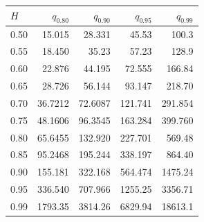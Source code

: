 \begin{tabular}{@{}lrrrr@{}}\toprule
$H$ & $q_{0.80}$ & $q_{0.90}$ & $q_{0.95}$ & $q_{0.99}$\\\midrule
0.50 & 15.015 & 28.331 & 45.53 & 100.3\\
0.55 & 18.450 & 35.23 & 57.23 & 128.9\\
0.60 & 22.876 & 44.195 & 72.555 & 166.84\\
0.65 & 28.726 & 56.144 & 93.147 & 218.70\\
0.70 & 36.7212 & 72.6087 & 121.741 & 291.854\\
0.75 & 48.1606 & 96.3545 & 163.284 & 399.760\\
0.80 & 65.6455 & 132.920 & 227.701 & 569.48\\
0.85 & 95.2468 & 195.244 & 338.197 & 864.40\\
0.90 & 155.181 & 322.168 & 564.474 & 1475.24\\
0.95 & 336.540 & 707.966 & 1255.25 & 3356.71\\
0.99 & 1793.35 & 3814.26 & 6829.94 & 18613.1\\
\bottomrule\end{tabular}
